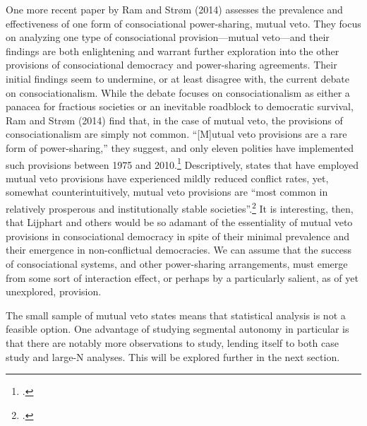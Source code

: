 \documentclass[12pt]{article}
\begin{document}
One more recent paper by Ram and Strøm (2014) assesses the prevalence and effectiveness of one form of consociational power-sharing, mutual veto. They focus on analyzing one type of consociational provision---mutual veto---and their findings are both enlightening and warrant further exploration into the other provisions of consociational democracy and power-sharing agreements. Their initial findings seem to undermine, or at least disagree with, the current debate on consociationalism. While the debate focuses on consociationalism as either a panacea for fractious societies or an inevitable roadblock to democratic survival, Ram and Strøm (2014) find that, in the case of mutual veto, the provisions of consociationalism are simply not common. ``[M]utual veto provisions are a rare form of power-sharing,'' they suggest, and only eleven polities have implemented such provisions between 1975 and 2010.\footcite[345]{ram_mutual_2014} Descriptively, states that have employed mutual veto provisions have experienced mildly reduced conflict rates, yet, somewhat counterintuitively, mutual veto provisions are ``most common in relatively prosperous and institutionally stable societies''.\footcite[355]{ram_mutual_2014} It is interesting, then, that Lijphart and others would be so adamant of the essentiality of mutual veto provisions in consociational democracy in spite of their minimal prevalence and their emergence in non-conflictual democracies. We can assume that the success of consociational systems, and other power-sharing arrangements, must emerge from some sort of interaction effect, or perhaps by a particularly salient, as of yet unexplored, provision.

The small sample of mutual veto states means that statistical analysis is not a feasible option. One advantage of studying segmental autonomy in particular is that there are notably more observations to study, lending itself to both case study and large-N analyses. This will be explored further in the next section.  
\end{document}
